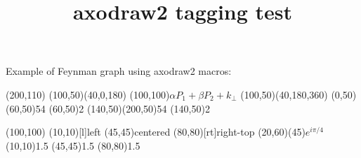 \documentclass{article}
\title{axodraw2 tagging test}
\begin{document}
Example of Feynman graph using axodraw2 macros:
\begin{center}
\begin{axopicture}[alt=Feynman graph](200,110)
\Arc[arrow](100,50)(40,0,180)
\Text(100,100){$\alpha P_1 + \beta P_2 + k_\perp$}
\Arc[arrow](100,50)(40,180,360)
\Gluon(0,50)(60,50){5}{4}
\Vertex(60,50){2}
\Gluon(140,50)(200,50){5}{4}
\Vertex(140,50){2}
\end{axopicture}
\end{center}
\begin{center}
\begin{axopicture}[alt=text example](100,100)
\Text(10,10)[l]{left}
\Text(45,45){centered}
\Text(80,80)[rt]{right-top}
\Text(20,60)(45){$e^{i\pi/4}$}
\Vertex(10,10){1.5}
\Vertex(45,45){1.5}
\Vertex(80,80){1.5}
\end{axopicture}
\end{center}
\end{document}
